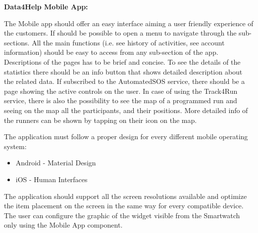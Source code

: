 \textbf{Data4Help Mobile App:}

The Mobile app should offer an easy interface aiming a user friendly experience of the customers. If should be possible to open a menu to navigate through the sub-sections. All the main functions (i.e. see history of activities, see account information) should be easy to access from any sub-section of the app. 
Descriptions of the pages has to be brief and concise.
To see the details of the statistics there should be an info button that shows detailed description about the related data.
If subscribed to the AutomatedSOS service, there should be a page showing the active controls on the user.
In case of using the Track4Run service, there is also the possibility to see the map of a programmed run and seeing on the map all the participants, and their positions. More detailed info of the runners can be shown by tapping on their icon on the map.

The application must follow a proper design for every different mobile operating system:
\begin{itemize}
    \item Android - \vspace{0.3cm} Material Design
    \item iOS - \vspace{0.3cm} Human Interfaces
\end{itemize}
The application should support all the screen resolutions available and optimize the item placement on the screen in the same way for every compatible device.
\newline
The user can configure the graphic of the widget visible from the Smartwatch only using the Mobile App component.

